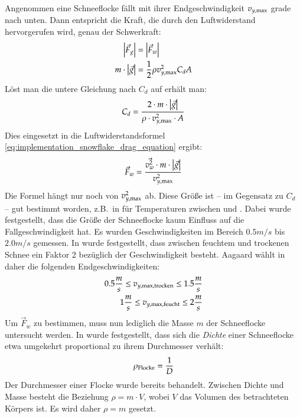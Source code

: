 Angenommen eine Schneeflocke fällt mit ihrer Endgeschwindigkeit
$v_{y,\textnormal{max}}$ grade nach unten. Dann
entspricht die Kraft, die durch den Luftwiderstand hervorgerufen wird,
genau der Schwerkraft:
\begin{align}
\left|\vec{F}_g\right| &= \left|\vec{F}_w\right| \\
m \cdot \left|\vec{g}\right| &= \frac{1}{2} \rho v_{y,\textnormal{max}}^2 C_d A
\end{align}
Löst man die untere Gleichung nach $C_d$ auf erhält man:
\begin{equation}
C_d
=
\frac
{
  2 \cdot m \cdot \left|\vec{g}\right|
}
{
  \rho \cdot v_{y,\textnormal{max}}^2 \cdot A
}
\end{equation}
Dies eingesetzt in die Luftwiderstandsformel
\ref{eq:implementation_snowflake_drag_equation} ergibt:
\begin{equation}
\vec{F}_w =
\frac
{
  \vec{v_w^2} \cdot m \cdot \left|\vec{g}\right|
}
{
  v_{y,\textnormal{max}}^2
}
\end{equation}
Die Formel hängt nur noch von $v_{y,\textnormal{max}}^2$
ab. Diese Größe ist -- im Gegensatz zu $C_d$ -- gut bestimmt worden,
z.B.\ in \cite{Hanesch1966} für Temperaturen zwischen 
und . Dabei wurde festgestellt,
dass die Größe der Schneeflocke kaum Einfluss auf die
Fallgeschwindigkeit hat. Es wurden Geschwindigkeiten im Bereich $0.5m/s$
bis $2.0m/s$ gemessen. In
\cite{Centre1998} wurde festgestellt, dass zwischen feuchtem und
trockenen Schnee ein Faktor 2 bezüglich der Geschwindigkeit
besteht. Aagaard wählt in \cite{Aagaard2004} daher die folgenden
Endgeschwindigkeiten:
\begin{align}
0.5 \frac{m}{s} \leq v_{y,\textnormal{max},\textnormal{trocken}} \leq 1.5 \frac{m}{s} \\
1 \frac{m}{s} \leq v_{y,\textnormal{max},\textnormal{feucht}} \leq 2 \frac{m}{s}
\end{align}
Um $\vec{F}_w$ zu bestimmen, muss nun lediglich die Masse $m$ der
Schneeflocke untersucht werden. In \cite{Centre1998} wurde
festgestellt, dass sich die \emph{Dichte} einer Schneeflocke etwa
umgekehrt proportional zu ihrem Durchmesser verhält:
\begin{align}
\rho_{\textnormal{Flocke}} = \frac{1}{D}
\end{align}
Der Durchmesser einer Flocke wurde bereits behandelt. Zwischen
Dichte und Masse besteht die Beziehung $\rho = m \cdot V$, wobei $V$
das Volumen des betrachteten Körpers ist. Es wird daher $\rho = m$
gesetzt.

